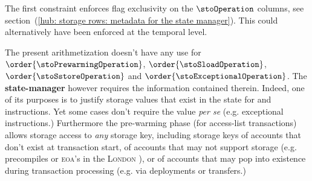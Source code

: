 \saNote{} \label{hub: consistencies: storage: constraints: exclusivity for the storage operation types}
The first constraint enforces flag exclusivity on the $\stoOperation$ columns, see section~(\ref{hub: storage rows: metadata for the state manager}).
This could alternatively have been enforced at the temporal level.

\saNote{} \label{hub: consistencies: storage: constraints: state manager columns}
The present arithmetization doesn't have any use for
$\order{\stoPrewarmingOperation}$,
$\order{\stoSloadOperation}$,
$\order{\stoSstoreOperation}$ and
$\order{\stoExceptionalOperation}$.
The \textbf{state-manager} however requires the information contained therein.
Indeed, one of its purposes is to justify storage values that exist in the state for  and  instructions.
Yet some cases don't require the value \emph{per se} (e.g. exceptional  instructions.)
Furthermore the pre-warming phase (for access-list transactions) allows storage access to \emph{any} storage key,
including storage keys of accounts that don't exist at transaction start,
of accounts that may not support storage (e.g. precompiles or \textsc{eoa}'s in the \textsc{London} \evm{}),
or of accounts that may pop into existence during transaction processing (e.g. via deployments or transfers.)
